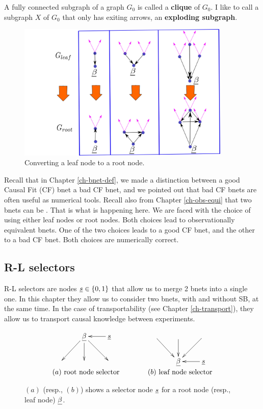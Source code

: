 A fully connected subgraph of 
a graph $G_0$ is called a 
{\bf clique} of $G_0$.
I like to call a subgraph $X$  of $G_0$ that only has exiting arrows, an 
{\bf exploding subgraph}.



\begin{figure}[h!]
\centering
\includegraphics[width=4in]
{sb-removal/sel-nd-reversal.png}
\caption{Converting 
a leaf node
to a root node.}
\label{fig-sel-nd-reversal}
\end{figure}

Recall that in Chapter \ref{ch-bnet-def},
we made a distinction
between a good Causal Fit (CF) bnet
a bad CF bnet, and
we pointed out
that bad CF bnets are
often useful as
numerical tools.
Recall also from Chapter
\ref{ch-obs-equi}
that two bnets can be
.
That is what is happening here.
We are faced with
the choice of
using
either
leaf nodes or root nodes.
Both
choices  lead to observationally
equivalent bnets.
One of the two choices
leads to a good
CF bnet,
and the other to a bad CF bnet.
Both choices are numerically
correct.

\subsection{R-L selectors}
R-L selectors are nodes 
$\rvs\in \bool$ that allow us to merge 2 bnets into a single one. In this chapter they allow us 
to consider two bnets, with and without SB, at the same time.
In the case of transportability (see Chapter \ref{ch-transport}), they allow us to transport causal knowledge
between experiments.


\begin{figure}[h!]
$$
\begin{array}{ccc}
\xymatrix{
&\rvbeta\ar[dl]\ar[d]\ar[dr]&\rvs\ar[l]
\\
&&
}
&\quad\quad&
\xymatrix{
\ar[dr]&\ar[d]&\ar[dl]
\\
&\rvbeta&\rvs\ar[l]
}
\\
(a)\text{ root node selector} 
&& (b)\text{ leaf node selector}
\end{array}
$$
\caption{$(a)$ (resp., $(b)$) shows a selector node $\rvs$ for a
root node (resp., leaf node) $\rvbeta$.}
\label{fig-rl-selectors}
\end{figure}

